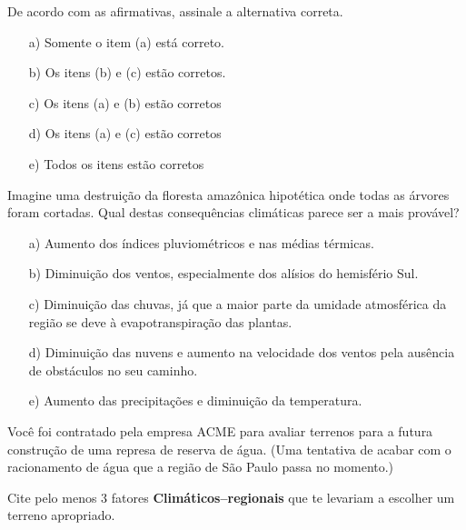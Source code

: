 \documentclass[letterpaper,portuguese,12pt,pdftex]{exam}
\begin{document}
\begin{questions}
De acordo com as afirmativas, assinale a alternativa correta.

\begin{itemize}
  \item[a)] Somente o item (a) está correto.
  \item[b)] Os itens (b) e (c) estão corretos.
  \item[c)] Os itens (a) e (b) estão corretos
  \item[d)] Os itens (a) e (c) estão corretos
  \item[e)] Todos os itens estão corretos
\end{itemize}


\question[2]
Imagine uma destruição da floresta amazônica hipotética onde todas as
árvores foram cortadas.  Qual destas consequências climáticas parece ser a
mais provável?
\begin{itemize}
  \item[a)] Aumento dos índices pluviométricos e nas médias térmicas.
  \item[b)] Diminuição dos ventos, especialmente dos alísios do hemisfério Sul.
  \item[c)] Diminuição das chuvas, já que a maior parte da umidade atmosférica da região se deve à evapotranspiração das plantas.
  \item[d)] Diminuição das nuvens e aumento na velocidade dos ventos pela ausência de obstáculos no seu caminho.
  \item[e)] Aumento das precipitações e diminuição da temperatura.
\end{itemize}

\question[2]
Você foi contratado pela empresa ACME para avaliar terrenos para a
futura construção de uma represa de reserva de água.  (Uma tentativa de acabar
com o racionamento de água que a região de São Paulo passa no momento.)

Cite pelo menos 3 fatores {\bf Climáticos--regionais} que te levariam a
escolher um terreno apropriado.

\end{questions}
\end{document}
